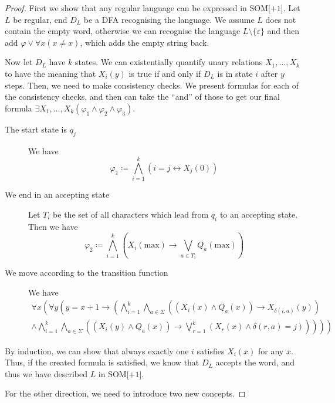 \begin{proof}
    First we show that any regular language can be expressed in SOM[$+1$].
    Let $L$ be regular, end $D_L$ be a DFA recognising the language.
    We assume $L$ does not contain the empty word, otherwise we can recognise the language $L \setminus \{\varepsilon\}$ and then add $\varphi \lor \forall x(x \neq x)$, which adds the empty string back.

    Now let $D_L$ have $k$ states.
    We can existentially quantify unary relations $X_1, \dots, X_k$ to have the meaning that $X_i(y)$ is true if and only if $D_L$ is in state $i$ after $y$ steps.
    Then, we need to make consistency checks.
    We present formulas for each of the consistency checks, and then can take the ``and'' of those to get our final formula $\exists X_1, \dots, X_k(\varphi_1 \land \varphi_2 \land \varphi_3)$.
    \begin{description}
        \item[The start state is $q_j$] We have \[\varphi_1 \coloneqq \bigwedge_{i = 1}^{k} (i = j \leftrightarrow X_j(0))\]
        \item[We end in an accepting state] Let $T_i$ be the set of all characters which lead from $q_i$ to an accepting state.
        Then we have
        \[
            \varphi_2 \coloneqq \bigwedge_{i = 1}^{k}\left(X_i(\text{max}) \to \bigvee_{a \in T_i} Q_a(\text{max})\right)
        \]
        \item[We move according to the transition function] We have
        \begin{align*}
            \forall x\left( \forall y \left( y = x + 1 \to \left(\bigwedge_{i = 1}^{k} \bigwedge_{a \in \Sigma} \left(\left(X_i(x) \land Q_a(x)\right) \to X_{\delta(i, a)}(y)\right) \right. \right. \right. \\
            \left. \left. \left.\land \bigwedge_{i = 1}^{k}\bigwedge_{a \in \Sigma} \left(\left(X_i(y) \land Q_a(x)\right) \to \bigvee_{r = 1}^{k}\left(X_r(x) \land \delta(r, a) = j\right)\right)  \right)  \right) \right)
        \end{align*}
    \end{description}
    By induction, we can show that always exactly one $i$ satisfies $X_i(x)$ for any $x$.
    Thus, if the created formula is satisfied, we know that $D_L$ accepts the word, and thus we have described $L$ in SOM[$+1$].

    \vspace{5mm}

    For the other direction, we need to introduce two new concepts.


\end{proof}
